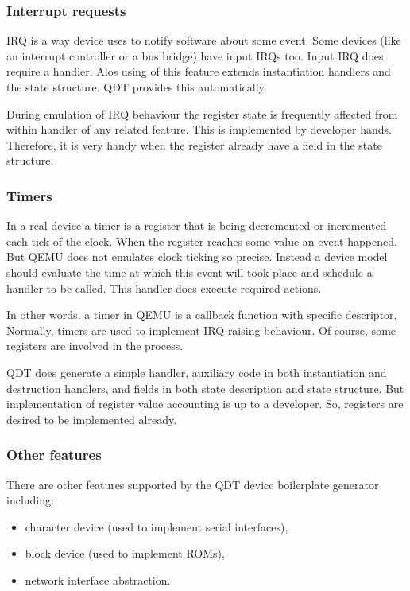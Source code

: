 \documentclass[conference,compsoc,a4paper]{IEEEtran}
\begin{document}
\subsubsection{Interrupt requests}

IRQ is a way device uses to notify software about some event.
Some devices (like an interrupt controller or a bus bridge) have input
IRQs too.
Input IRQ does require a handler.
Alos using of this feature extends instantiation handlers and the
state structure.
QDT provides this automatically.

During emulation of IRQ behaviour the register state is frequently
affected from within handler of any related feature.
This is implemented by developer hands.
Therefore, it is very handy when the register already have a field in the
state structure.

\subsubsection{Timers}

In a real device a timer is a register that is being decremented or
incremented each tick of the clock.
When the register reaches some value an event happened.
But QEMU does not emulates clock ticking so precise.
Instead a device model should evaluate the time at which this event will
took place and schedule a handler to be called.
This handler does execute required actions.

In other words, a timer in QEMU is a callback function with specific
descriptor.
Normally, timers are used to implement IRQ raising behaviour.
Of course, some registers are involved in the process.

QDT does generate a simple handler, auxiliary code in both instantiation
and destruction handlers, and fields in both state description and
state structure.
But implementation of register value accounting is up to a developer.
So, registers are desired to be implemented already.

\subsubsection{Other features}

There are other features supported by the QDT device boilerplate generator
including:

\begin{itemize}
    \item character device (used to implement serial interfaces),
    \item block device (used to implement ROMs),
    \item network interface abstraction.
\end{itemize}
\end{document}
